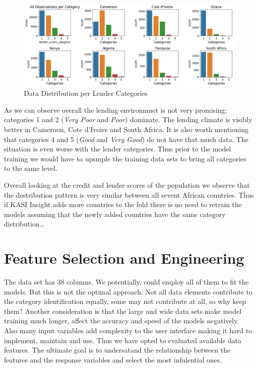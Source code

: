 \begin{Schunk}
\begin{figure}[H]

{\centering \includegraphics[width=1.15\linewidth]{../../artifacts/lcategories} 

}

\caption[Data Distribution per Lender Categories]{Data Distribution per Lender Categories}\label{fig:dl}
\end{figure}
\end{Schunk}

As we can observe overall the lending environmnet is not very promising;
categories 1 and 2 (\emph{Very Poor} and \emph{Poor}) dominate. The
lending climate is visibly better in Cameroon, Cote d'Ivoire and South
Africa. It is also worth mentioning that categories 4 and 5 (\emph{Good}
and \emph{Very Good}) do not have that much data. The situation is even
worse with the lender categories. Thus prior to the model training we
would have to upsmple the training data sets to bring all categories to
the same level.

Overall looking at the credit and lender scores of the population we
observe that the destribution pattern is very similar between all sevent
African countries. Thus if KASI Insight adds more countries to the fold
there is no need to retrain the models assuming that the newly added
countries have the same category distribution\ldots{}

\hypertarget{feature-selection-and-engineering}{%
\section{Feature Selection and
Engineering}\label{feature-selection-and-engineering}}

The data set has 38 columns. We potentially, could employ all of them to
fit the models. But this is not the optimal approach. Not all data
elements contribute to the category identification equally, some may not
contribute at all, so why keep them? Another consideration is that the
large and wide data sets make model training much longer, affect the
accuracy and speed of the models negatively. Also many input variables
add complexity to the user interface making it hard to implement,
maintain and use. Thus we have opted to evaluated available data
features. The ultimate goal is to undersatand the relationship between
the features and the response variables and select the most infulential
ones.

